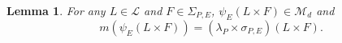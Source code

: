 \documentclass[11pt]{article}
\newtheorem{lemma}[theorem]{Lemma}
\newtheorem{remark}{Remark}
\begin{document}

\begin{lemma}\label{lem:AllMeasurableRectangles} For any $L\in\mathcal{L}$ and $F\in \Sigma_{P,E}$, $\psi_E(L\times F)\in\mathcal{M}_d$ and 
\begin{equation*}
m(\psi_E(L\times F))=(\lambda_P\times\sigma_{P,E})(L\times F).
\end{equation*}
\end{lemma}
\end{document}
